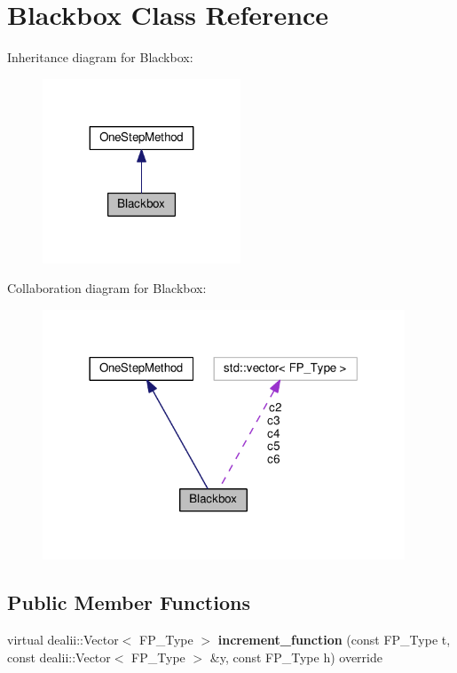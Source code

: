 \hypertarget{classBlackbox}{}\section{Blackbox Class Reference}
\label{classBlackbox}


Inheritance diagram for Blackbox\+:
\nopagebreak
\begin{figure}[H]
\begin{center}
\leavevmode
\includegraphics[width=167pt]{classBlackbox__inherit__graph}
\end{center}
\end{figure}


Collaboration diagram for Blackbox\+:
\nopagebreak
\begin{figure}[H]
\begin{center}
\leavevmode
\includegraphics[width=306pt]{classBlackbox__coll__graph}
\end{center}
\end{figure}
\subsection*{Public Member Functions}
\begin{DoxyCompactItemize}
\item 
\mbox{\label{classBlackbox_a38b421a2cc7fa40d8dadf09f44b9b80a}} 
virtual dealii\+::\+Vector$<$ F\+P\+\_\+\+Type $>$ {\bfseries increment\+\_\+function} (const F\+P\+\_\+\+Type t, const dealii\+::\+Vector$<$ F\+P\+\_\+\+Type $>$ \&y, const F\+P\+\_\+\+Type h) override
\end{DoxyCompactItemize}
